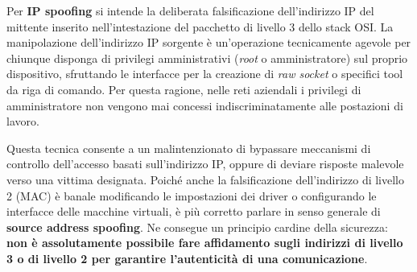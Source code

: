 \documentclass[../../main.tex]{subfiles}
\begin{document}
Per \textbf{IP spoofing} si intende la deliberata falsificazione dell'indirizzo IP del mittente inserito nell'intestazione del pacchetto di livello 3 dello stack OSI. La manipolazione dell'indirizzo IP sorgente è un'operazione tecnicamente agevole per chiunque disponga di privilegi amministrativi (\textit{root} o amministratore) sul proprio dispositivo, sfruttando le interfacce per la creazione di \textit{raw socket} o specifici tool da riga di comando. Per questa ragione, nelle reti aziendali i privilegi di amministratore non vengono mai concessi indiscriminatamente alle postazioni di lavoro.

Questa tecnica consente a un malintenzionato di bypassare meccanismi di controllo dell'accesso basati sull'indirizzo IP, oppure di deviare risposte malevole verso una vittima designata. Poiché anche la falsificazione dell'indirizzo di livello 2 (MAC) è banale modificando le impostazioni dei driver o configurando le interfacce delle macchine virtuali, è più corretto parlare in senso generale di \textbf{source address spoofing}. Ne consegue un principio cardine della sicurezza: \textbf{non è assolutamente possibile fare affidamento sugli indirizzi di livello 3 o di livello 2 per garantire l'autenticità di una comunicazione}.
\end{document}
